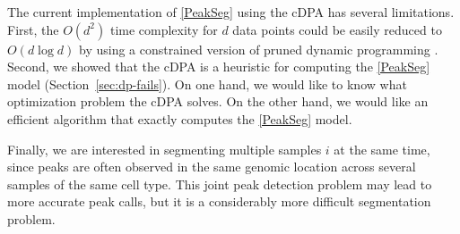 \documentclass{article}
\begin{document}
The current implementation of \ref{PeakSeg} using the cDPA has several
limitations. First, the $O(d^2)$ time complexity for $d$ data points
could be easily reduced to $O(d\log d)$ by using a constrained version
of pruned dynamic programming \citep{pruned-dp, Segmentor}. Second, we
showed that the cDPA is a heuristic for computing the \ref{PeakSeg}
model (Section~\ref{sec:dp-fails}). On one hand, we would like to know
what optimization problem the cDPA solves. On the other hand, we would
like an efficient algorithm that exactly computes the \ref{PeakSeg}
model.

Finally, we are interested in segmenting multiple samples $i$ at the
same time, since peaks are often observed in the same genomic location
across several samples of the same cell type. This joint peak
detection problem may lead to more accurate peak calls, but it is a
considerably more difficult segmentation problem.


\newpage





\end{document}
